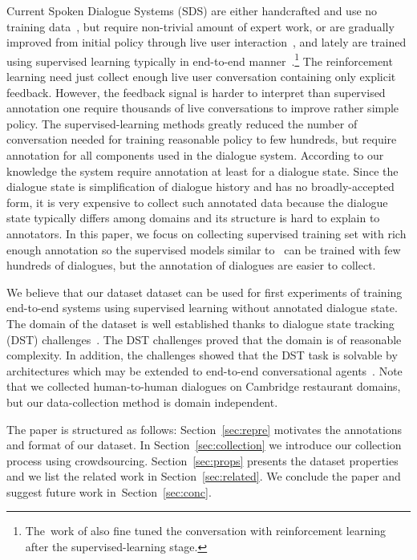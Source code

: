 \documentclass[runningheads,a4paper]{llncs}
\begin{document}
Current Spoken Dialogue Systems (SDS) are either handcrafted and use no training data~\cite{duvsek2014alex,raux2005let}, but require non-trivial amount of expert work, or are gradually improved from initial policy through live user interaction~\cite{young2010hidden,gasic2011line}, and lately are trained using supervised learning typically in end-to-end manner~\cite{wen2016network,williams2016end}.\footnote{The~work of \cite{williams2016end} also fine tuned the conversation with reinforcement learning after the supervised-learning stage.}
The reinforcement learning need just collect enough live user conversation containing only explicit feedback.
However, the feedback signal is harder to interpret than supervised annotation one require thousands of live conversations to improve rather simple policy.\cite{gasic2011line}
The supervised-learning methods greatly reduced the number of conversation needed for training reasonable policy to few hundreds\cite{wen2016network}, but require annotation for all components used in the dialogue system.
According to our knowledge the system require annotation at least for a dialogue state\cite{wen2016network,young2010hidden}.
Since the dialogue state is simplification of dialogue history and has no broadly-accepted form, it is very expensive to collect such annotated data because the dialogue state typically differs among domains and its structure is hard to explain to annotators.
In this paper, we focus on collecting supervised training set with rich enough annotation so the supervised models similar to~\cite{wen2016network} can be trained with few hundreds of dialogues, but the annotation of dialogues are easier to collect.

We believe that our dataset dataset can be used for first experiments of training end-to-end systems using supervised learning without annotated dialogue state.
The domain of the dataset is well established thanks to dialogue state tracking (DST) challenges~\cite{williams2013dstc1,henderson2014dstc2,henderson2014dstc3}. 
The DST challenges proved that the domain is of reasonable complexity.
In addition, the challenges showed that the DST task is solvable by architectures which may be extended to end-to-end conversational agents~\cite{platek2016recurrent,vodolan2015hybrid,henderson2014word}.
Note that we collected human-to-human dialogues on Cambridge restaurant domains, but our data-collection method is domain independent.

The paper is structured as follows: Section~\ref{sec:repre} motivates the annotations and format of our dataset.
In Section~\ref{sec:collection} we introduce our collection process using crowdsourcing.
Section~\ref{sec:props} presents the dataset properties and we list the related work in Section~\ref{sec:related}.
We conclude the paper and suggest future work in~Section~\ref{sec:conc}.
\end{document}
